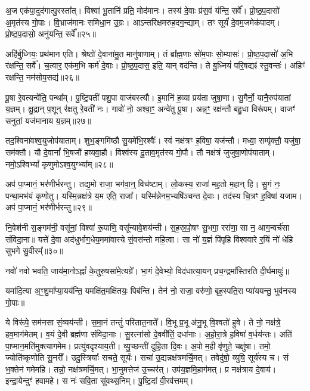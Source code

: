 अ॒ज एक॑पा॒दुद॑गात्पु॒रस्ता᳚त्।
विश्वा॑ भू॒तानि॑ प्रति॒ मोद॑मानः।
तस्य॑ दे॒वाः प्र॑स॒वं य॑न्ति॒ सर्वे᳚।
प्रो॒ष्ठ॒प॒दासो॑ अ॒मृत॑स्य गो॒पाः।
वि॒भ्राज॑मानः समिधा॒न उ॒ग्रः।
आऽन्तरि॑क्षमरुह॒दग॒न्द्याम्।
तꣳ सूर्यं॑ दे॒वम॒जमेक॑पादम्।
प्रो॒ष्ठ॒प॒दासो॒ अनु॑यन्ति॒ सर्वे᳚॥२५॥ 

अहि॑र्बु॒ध्नियः॒ प्रथ॑मान एति।
श्रेष्ठो॑ दे॒वाना॑मु॒त मानु॑षाणाम्।
तं ब्रा᳚ह्म॒णाः सो॑म॒पाः सो॒म्यासः॑।
प्रो॒ष्ठ॒प॒दासो॑ अ॒भि र॑क्षन्ति॒ सर्वे᳚।
च॒त्वार॒ एक॑म॒भि कर्म॑ दे॒वाः।
प्रो॒ष्ठ॒प॒दास॒ इति॒ यान् वद॑न्ति।
ते बु॒ध्नियं॑ परि॒षद्यꣴ॑ स्तु॒वन्तः॑।
अहिꣳ॑ रक्षन्ति॒ नम॑सोप॒सद्य॑॥२६॥ 

पू॒षा रे॒वत्यन्वे॑ति॒ पन्था᳚म्।
पु॒ष्टि॒पती॑ पशु॒पा वाज॑बस्त्यौ।
इ॒मानि॑ ह॒व्या प्रय॑ता जुषा॒णा।
सु॒गैर्नो॒ यानै॒रुप॑यातां य॒ज्ञम्।
क्षु॒द्रान् प॒शून् र॑क्षतु रे॒वती॑ नः।
गावो॑ नो॒ अश्वा॒ꣳ॒ अन्वे॑तु पू॒षा।
अन्न॒ꣳ॒ रक्ष॑न्तौ बहु॒धा विरू॑पम्।
वाजꣳ॑ सनुतां॒ यज॑मानाय य॒ज्ञम्॥२७॥ 

तद॒श्विना॑वश्व॒युजोप॑याताम्।
शुभ॒ङ्गमि॑ष्ठौ सु॒यमे॑भि॒रश्वैः᳚।
स्वं नक्ष॑त्रꣳ ह॒विषा॒ यज॑न्तौ।
मध्वा॒ सम्पृ॑क्तौ॒ यजु॑षा॒ सम॑क्तौ।
यौ दे॒वानां᳚ भि॒षजौ॑ हव्यवा॒हौ।
विश्व॑स्य दू॒ताव॒मृत॑स्य गो॒पौ।
तौ नक्ष॑त्रं जुजुषा॒णोप॑याताम्।
नमो॒ऽश्विभ्यां᳚ कृणुमोऽश्व॒युग्भ्या᳚म्॥२८॥ 

अप॑ पा॒प्मानं॒ भर॑णीर्भरन्तु।
तद्य॒मो राजा॒ भग॑वा॒न्॒ विच॑ष्टाम्।
लो॒कस्य॒ राजा॑ मह॒तो म॒हान् हि।
सु॒गं नः॒ पन्था॒मभ॑यं कृणोतु।
यस्मि॒न्नक्ष॑त्रे य॒म एति॒ राजा᳚।
यस्मि॑न्नेनम॒भ्यषि॑ञ्चन्त दे॒वाः।
तद॑स्य चि॒त्रꣳ ह॒विषा॑ यजाम।
अप॑ पा॒प्मानं॒ भर॑णीर्भरन्तु॥२९॥ 

नि॒वेश॑नी स॒ङ्गम॑नी॒ वसू॑नां॒ विश्वा॑ रू॒पाणि॒ वसू᳚न्यावे॒शय॑न्ती। 
स॒ह॒स्र॒पो॒षꣳ सु॒भगा॒ ररा॑णा॒ सा न॒ आग॒न्वर्च॑सा संविदा॒ना॥ यत्ते॑ दे॒वा अद॑धुर्भाग॒धेय॒ममा॑वास्ये सं॒वस॑न्तो महि॒त्वा। 
सा नो॑ य॒ज्ञं पि॑पृहि विश्ववारे र॒यिं नो॑ धेहि सुभगे सु॒वीरम्᳚॥३०॥ 

\closesection


नवो॑ नवो भवति॒ जाय॑मा॒नोऽह्नां᳚ के॒तुरु॒षसा॑मे॒त्यग्रे᳚।
भा॒गं दे॒वेभ्यो॒ विद॑धात्या॒यन् प्रच॒न्द्रमा᳚स्तिरति दी॒र्घमायुः॑॥

यमा॑दि॒त्या अ॒ꣳ॒शु॒मा᳚प्या॒यय॑न्ति॒ यमक्षि॑त॒मक्षि॑तयः॒ पिब॑न्ति।
तेन॑ नो॒ राजा॒ वरु॑णो॒ बृह॒स्पति॒रा प्या॑ययन्तु॒ भुव॑नस्य गो॒पाः॥

ये विरू॑पे॒ सम॑नसा सं॒व्यय॑न्ती। स॒मा॒नं तन्तुं॑ परितात॒नाते᳚।
वि॒भू प्र॒भू अ॑नु॒भू वि॒श्वतो॑ हुवे। ते नो॒ नक्ष॑त्रे॒ हव॒माग॑मेतम्।
व॒यं दे॒वी ब्रह्म॑णा संविदा॒नाः। सु॒रत्ना॑सो दे॒ववी॑तिं॒ दधा॑नाः।
अ॒हो॒रा॒त्रे ह॒विषा॑ व॒र्धय॑न्तः। अति॑ पा॒प्मान॒मति॑मुक्त्यागमेम।
प्रत्यु॑वदृश्याय॒ती। व्यु॒च्छन्ती॑ दुहि॒ता दि॒वः।
अ॒पो म॒ही वृ॑णुते॒ चक्षु॑षा। तमो॒ ज्योति॑ष्कृणोति सू॒नरी᳚।
उदु॒स्त्रियाः᳚ सचते॒ सूर्यः॑। सचा॑ उ॒द्यन्नक्ष॑त्रमर्चि॒मत्।
तवेदु॑षो॒ व्युषि॒ सूर्य॑स्य च। सं भ॒क्तेन॑ गमेमहि।
तन्नो॒ नक्ष॑त्रमर्चि॒मत्। भा॒नुमत्तेज॑ उ॒च्चर॑त्।
उप॑य॒ज्ञमि॒हाग॑मत्।
प्र नक्ष॑त्राय दे॒वाय॑। इन्द्रा॒येन्दुꣳ॑ हवामहे।
स नः॑ सवि॒ता सु॑वथ्स॒निम्। पु॒ष्टि॒दां वी॒रव॑त्तमम्।


